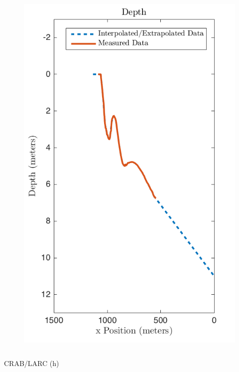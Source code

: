 \documentclass[7pt]{beamer}
\begin{document}
\begin{frame}
\begin{columns}
\begin{figure}[h]
\includegraphics[width=.70\linewidth]{img/DepthChart.png}
\end{figure}
\end{columns}
CRAB/LARC (h)
\end{frame}

\end{document}
